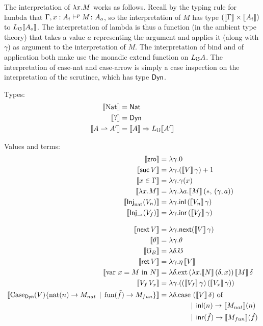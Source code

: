 The interpretation of $\lambda {x} . {M}$ works as follows. Recall by the typing rule for
lambda that ${\Gamma, x : A_i} \vdash^p {M} \colon {{A_o}}$, so the interpretation of $M$
has type $(\llbracket {\Gamma} \rrbracket \times \llbracket {A_i} \rrbracket)$ to $L_\mho \llbracket {A_o} \rrbracket$.
The interpretation of lambda is thus a function (in the ambient type theory) that takes
a value $a$ representing the argument and applies it (along with $\gamma$) as argument to
the interpretation of $M$.
%
The interpretation of bind and of application both make use the monadic extend function on $L_\mho A$.
%
The interpretation of case-nat and case-arrow is simply a case inspection on the
interpretation of the scrutinee, which has type $\mathsf{Dyn}$.


\vspace{2ex}


\noindent Types:
\begin{align*}
  \llbracket {\text{Nat}} \rrbracket &= \mathsf{Nat} \\
  \llbracket {?} \rrbracket &= \mathsf{Dyn} \\
  \llbracket {A \rightharpoonup A'} \rrbracket &= \llbracket {A} \rrbracket \Rightarrow L_\mho \llbracket {A'} \rrbracket \\
\end{align*}


\noindent Values and terms:
\begin{align*}
  \sem{\zro}         &= \lambda \gamma . 0 \\
  \sem{\suc\, V}     &= \lambda \gamma . (\sem{V}\, \gamma) + 1 \\
  \sem{x \in \Gamma} &= \lambda \gamma . \gamma(x) \\
  \sem{\lda{x}{M}}   &= \lambda \gamma . \lambda a . \sem{M}\, (*,\, (\gamma , a))  \\
  \sem{\injnat{V_n}} &= \lambda \gamma . \inl\, (\sem{V_n}\, \gamma) \\
  \sem{\injarr{V_f}} &= \lambda \gamma . \inr\, (\sem{V_f}\, \gamma) \\[2ex]
  \sem{\nxt\, V}     &= \lambda \gamma . \nxt (\sem{V}\, \gamma) \\
  \sem{\theta}       &= \lambda \gamma . \theta \\
%
  \sem{\err_B}         &= \lambda \delta . \mho \\
  \sem{\ret\, V}       &= \lambda \gamma . \eta\, \sem{V} \\
  \sem{\bind{x}{M}{N}} &= \lambda \delta . \ext {(\lambda x . \sem{N}\, (\delta, x))} {\sem{M}\, \delta} \\
  \sem{V_f\, V_x}      &= \lambda \gamma . {({(\sem{V_f}\, \gamma)} \, {(\sem{V_x}\, \gamma)})} \\
  \sem{\casedyn{V}{n}{M_{nat}}{\tilde{f}}{M_{fun}}} &=
    \lambda \delta . \text{case $(\sem{V}\, \delta)$ of} \\ 
    &\quad\quad\quad\quad \alt \inl(n) \to \sem{M_{nat}}(n) \\
    &\quad\quad\quad\quad \alt \inr(\tilde{f}) \to \sem{M_{fun}}(\tilde{f})
\end{align*}
